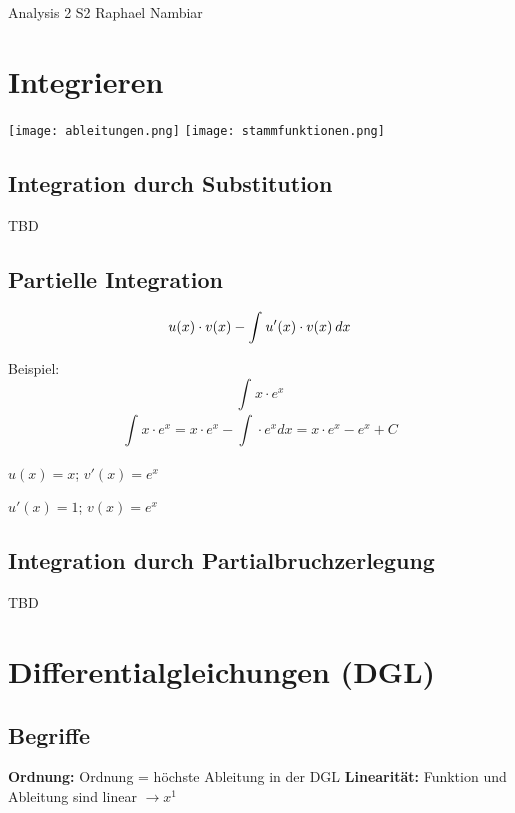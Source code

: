 



\begin{multicols*}{3}

\DocumentInfo
{Analysis 2 S2} %
{Raphael Nambiar} %

\WhiteSpace

\section{Integrieren}

 \texttt{[image: ableitungen.png]} 
  \texttt{[image: stammfunktionen.png]} 

\subsection{Integration durch Substitution}
{TBD}

\subsection{Partielle Integration}
{\large $$u(x)\cdot v(x) - \int_{}^{}u'(x) \cdot v(x) \hspace{2px}  dx$$}

\begin{multicols}{2}
{Beispiel:}
 \[ \int_{}{}x\cdot e^x\]
$$ \int_{}{}x\cdot e^x = x\cdot e^x -  \int_{}{}\cdot e^x dx = x\cdot e^x - e^x + C $$
\columnbreak
 
{$u(x)=x$; $v'(x)=e^x$}

{$u'(x)=1$; $v(x)=e^x$}

\end{multicols}





\subsection{Integration durch Partialbruchzerlegung}
{TBD}

\section{Differentialgleichungen (DGL)}
\subsection{Begriffe}
{\textbf{Ordnung:} Ordnung = höchste Ableitung in der DGL}
{\textbf{Linearität:} Funktion und Ableitung sind linear $\rightarrow x^1$ }


\end{multicols*}
